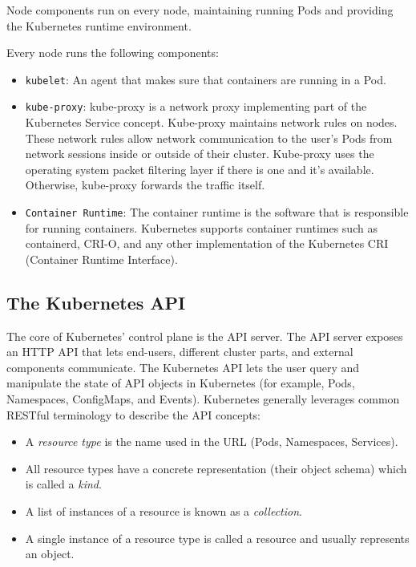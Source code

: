 Node components run on every node, maintaining running Pods and providing the
Kubernetes runtime environment.

Every node runs the following components:

\begin{itemize}
	\item
	      \texttt{kubelet}: An agent that makes sure that containers are running
	      in a Pod.
	\item
	      \texttt{kube-proxy}: kube-proxy is a network proxy implementing part
	      of the Kubernetes Service concept. Kube-proxy maintains network rules
	      on nodes. These network rules allow network communication to the
	      user's Pods from network sessions inside or outside of their cluster.
	      Kube-proxy uses the operating system packet filtering layer if there
	      is one and it's available. Otherwise, kube-proxy forwards the traffic
	      itself.
	\item
	      \texttt{Container Runtime}: The container runtime is the software that
	      is responsible for running containers. Kubernetes supports container
	      runtimes such as containerd, CRI-O, and any other implementation of
	      the Kubernetes CRI (Container Runtime Interface).
\end{itemize}

\subsection{The Kubernetes API}

The core of Kubernetes' control plane is the API server. The API server exposes
an HTTP API that lets end-users, different cluster parts, and external
components communicate. The Kubernetes API lets the user query and manipulate
the state of API objects in Kubernetes (for example, Pods, Namespaces,
ConfigMaps, and Events). Kubernetes generally leverages common RESTful
terminology to describe the API concepts:


\begin{itemize}
	\tightlist
	\item A \textit{resource type} is the name used in the URL (Pods,
	      Namespaces, Services).
	\item All resource types have a concrete representation (their object
	      schema) which is called a \textit{kind}.
	\item A list of instances of a resource is known as a \textit{collection}.
	\item A single instance of a resource type is called a resource and usually
	      represents an object.
\end{itemize}

